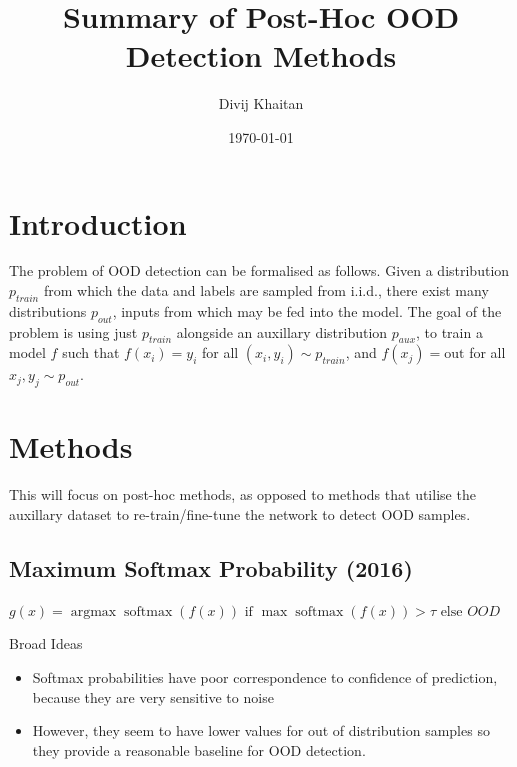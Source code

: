 \documentclass{article}
\title{Summary of Post-Hoc OOD Detection Methods}
\author{Divij Khaitan}
\date{\today}
\DeclareMathOperator{\softmax}{softmax}
\DeclareMathOperator{\argmax}{argmax}
\begin{document}
    \maketitle

    \section{Introduction}
        The problem of OOD detection can be formalised as follows. Given a distribution $p_{train}$ from which the data and labels are sampled from i.i.d., there exist many distributions $p_{out}$, inputs from which may be fed into the model. The goal of the problem is using just $p_{train}$ alongside an auxillary distribution $p_{aux}$, to train a model $f$ such that $f(x_i) = y_i$ for all $(x_i, y_i) \sim p_{train}$, and $f(x_j) = \text{out}$ for all $x_j, y_j \sim p_{out}$.



    \section{Methods}
        This will focus on post-hoc methods, as opposed to methods that utilise the auxillary dataset to re-train/fine-tune the network to detect OOD samples.

        \subsection{Maximum Softmax Probability (2016)}
            $g(x) = \argmax \softmax(f(x)) \text{ if } \max \softmax(f(x)) > \tau \text{ else } OOD$
            
            Broad Ideas
            \begin{itemize}
                \item 
                    Softmax probabilities have poor correspondence to confidence of prediction, because they are very sensitive to noise
                \item 
                    However, they seem to have lower values for out of distribution samples so they provide a reasonable baseline for OOD detection.
            \end{itemize}
\end{document}
